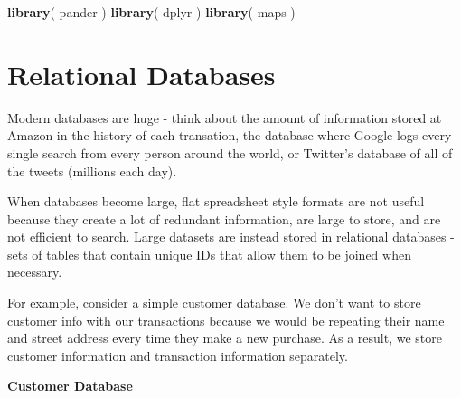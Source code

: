 \documentclass[]{book}
\newenvironment{Shaded}{\begin{snugshade}}{\end{snugshade}}
\newcommand{\KeywordTok}[1]{\textcolor[rgb]{0.13,0.29,0.53}{\textbf{#1}}}
\newcommand{\NormalTok}[1]{#1}
\theoremstyle{definition}
\theoremstyle{definition}
\theoremstyle{definition}
\theoremstyle{remark}
\begin{document}
\begin{Shaded}
\begin{Highlighting}[]
\KeywordTok{library}\NormalTok{( pander )}
\KeywordTok{library}\NormalTok{( dplyr )}
\KeywordTok{library}\NormalTok{( maps )}
\end{Highlighting}
\end{Shaded}

\hypertarget{relational-databases}{%
\section{Relational Databases}\label{relational-databases}}

Modern databases are huge - think about the amount of information stored
at Amazon in the history of each transation, the database where Google
logs every single search from every person around the world, or
Twitter's database of all of the tweets (millions each day).

When databases become large, flat spreadsheet style formats are not
useful because they create a lot of redundant information, are large to
store, and are not efficient to search. Large datasets are instead
stored in relational databases - sets of tables that contain unique IDs
that allow them to be joined when necessary.

For example, consider a simple customer database. We don't want to store
customer info with our transactions because we would be repeating their
name and street address every time they make a new purchase. As a
result, we store customer information and transaction information
separately.

\textbf{Customer Database}
\end{document}
